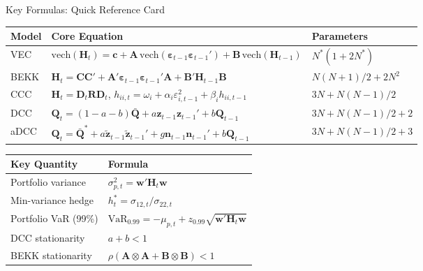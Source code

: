 \documentclass[9pt, aspectratio=169, t]{beamer}
\begin{document}
\begin{frame}{Key Formulas: Quick Reference Card}
    \begin{cminipage}{0.95\textwidth}
    \vspace{-1mm}
    {\scriptsize
    \renewcommand{\arraystretch}{1.3}
    \begin{tabular}{@{}p{1.8cm}p{7.2cm}p{3.5cm}@{}}
        \toprule
        \textbf{Model} & \textbf{Core Equation} & \textbf{Parameters} \\
        \midrule
        VEC & $\text{vech}(\mathbf{H}_t) = \mathbf{c} + \mathbf{A}\,\text{vech}(\boldsymbol{\varepsilon}_{t-1}\boldsymbol{\varepsilon}_{t-1}') + \mathbf{B}\,\text{vech}(\mathbf{H}_{t-1})$ & $N^*(1 + 2N^*)$ \\
        BEKK & $\mathbf{H}_t = \mathbf{C}\mathbf{C}' + \mathbf{A}'\boldsymbol{\varepsilon}_{t-1}\boldsymbol{\varepsilon}_{t-1}'\mathbf{A} + \mathbf{B}'\mathbf{H}_{t-1}\mathbf{B}$ & $N(N{+}1)/2 + 2N^2$ \\
        CCC & $\mathbf{H}_t = \mathbf{D}_t\mathbf{R}\mathbf{D}_t$, \quad $h_{ii,t} = \omega_i + \alpha_i\varepsilon_{i,t-1}^2 + \beta_i h_{ii,t-1}$ & $3N + N(N{-}1)/2$ \\
        DCC & $\mathbf{Q}_t = (1{-}a{-}b)\bar{\mathbf{Q}} + a\mathbf{z}_{t-1}\mathbf{z}_{t-1}' + b\mathbf{Q}_{t-1}$ & $3N + N(N{-}1)/2 + 2$ \\
        aDCC & $\mathbf{Q}_t = \bar{\mathbf{Q}}^* + a\tilde{\mathbf{z}}_{t-1}\tilde{\mathbf{z}}_{t-1}' + g\mathbf{n}_{t-1}\mathbf{n}_{t-1}' + b\mathbf{Q}_{t-1}$ & $3N + N(N{-}1)/2 + 3$ \\
        \bottomrule
    \end{tabular}
    \vspace{2mm}

    \begin{tabular}{@{}p{3.5cm}p{9cm}@{}}
        \toprule
        \textbf{Key Quantity} & \textbf{Formula} \\
        \midrule
        Portfolio variance & $\sigma^2_{p,t} = \mathbf{w}'\mathbf{H}_t\mathbf{w}$ \\
        Min-variance hedge & $h_t^* = \sigma_{12,t} / \sigma_{22,t}$ \\
        Portfolio VaR (99\%) & $\text{VaR}_{0.99} = -\mu_{p,t} + z_{0.99}\sqrt{\mathbf{w}'\mathbf{H}_t\mathbf{w}}$ \\
        DCC stationarity & $a + b < 1$ \\
        BEKK stationarity & $\rho(\mathbf{A} \otimes \mathbf{A} + \mathbf{B} \otimes \mathbf{B}) < 1$ \\
        \bottomrule
    \end{tabular}
    }
    \end{cminipage}
\end{frame}
\end{document}
